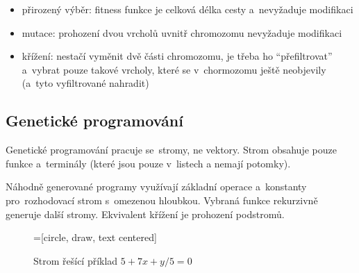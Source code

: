 \begin{itemize}
\item přirozený výběr: fitness funkce je celková délka cesty a~nevyžaduje modifikaci
\item mutace: prohození dvou vrcholů uvnitř chromozomu nevyžaduje modifikaci
\item křížení: nestačí vyměnit dvě části chromozomu, je třeba ho \enquote{přefiltrovat} a~vybrat pouze takové vrcholy, které se v~chormozomu ještě neobjevily (a~tyto vyfiltrované nahradit)
\end{itemize}

\subsection{Genetické programování}

Genetické programování pracuje se~stromy, ne vektory.
Strom obsahuje pouze funkce a~terminály (které jsou pouze v~listech a nemají potomky).

Náhodně generované programy využívají základní operace a~konstanty pro~rozhodovací strom s~omezenou hloubkou.
Vybraná funkce rekurzivně generuje další stromy.
Ekvivalent křížení je prohození podstromů.

\begin{figure}[ht]
    \centering
    =[circle, draw, text centered]
    \caption{Strom řešící příklad $5 + 7x + y/5 = 0$}
\end{figure}
\FloatBarrier

